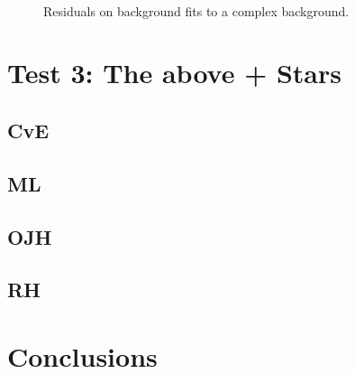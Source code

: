 \documentclass[10pt, a4paper]{article}
\begin{document}
\begin{figure}[!ht]
   \centering
   \quad
   \\
   \quad
   \caption{Residuals on background fits to a complex background.}
\end{figure}


\clearpage
\section{Test 3: The above + Stars}
\subsection{CvE}
\subsection{ML}
\subsection{OJH}
\subsection{RH}


\section{Conclusions}
\end{document}

